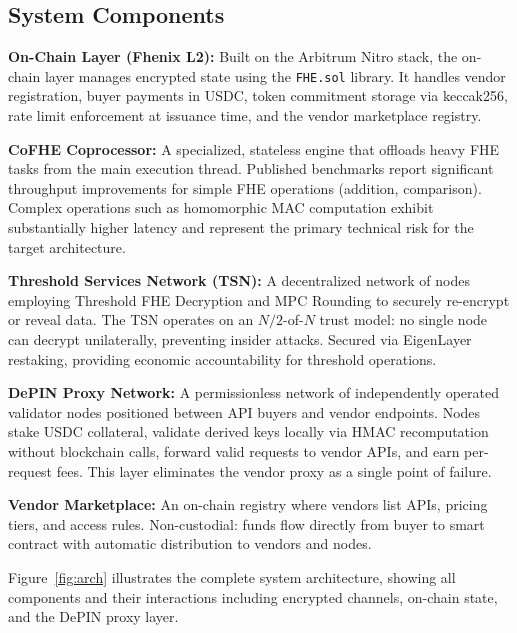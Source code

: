 \documentclass[conference]{IEEEtran}
\begin{document}
\subsection{System Components}

\textbf{On-Chain Layer (Fhenix L2):} Built on the Arbitrum Nitro stack, the on-chain
layer manages encrypted state using the \texttt{FHE.sol} library. It handles vendor
registration, buyer payments in USDC, token commitment storage via keccak256, rate
limit enforcement at issuance time, and the vendor marketplace registry.

\textbf{CoFHE Coprocessor:} A specialized, stateless engine that offloads heavy FHE
tasks from the main execution thread. Published benchmarks report significant throughput
improvements for simple FHE operations (addition, comparison). Complex operations such
as homomorphic MAC computation exhibit substantially higher latency and represent the
primary technical risk for the target architecture.

\textbf{Threshold Services Network (TSN):} A decentralized network of nodes employing
Threshold FHE Decryption and MPC Rounding \cite{mpc_rounding} to securely re-encrypt
or reveal data. The TSN operates on an $N/2$-of-$N$ trust model: no single node can
decrypt unilaterally, preventing insider attacks. Secured via EigenLayer restaking,
providing economic accountability for threshold operations.

\textbf{DePIN Proxy Network:} A permissionless network of independently operated validator
nodes positioned between API buyers and vendor endpoints. Nodes stake USDC collateral,
validate derived keys locally via HMAC recomputation without blockchain calls, forward
valid requests to vendor APIs, and earn per-request fees. This layer eliminates the
vendor proxy as a single point of failure.

\textbf{Vendor Marketplace:} An on-chain registry where vendors list APIs, pricing tiers,
and access rules. Non-custodial: funds flow directly from buyer to smart contract with
automatic distribution to vendors and nodes.

Figure~\ref{fig:arch} illustrates the complete system architecture, showing all
components and their interactions including encrypted channels, on-chain state, and the
DePIN proxy layer.
\end{document}
